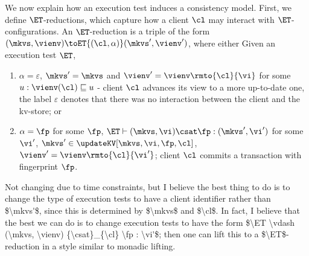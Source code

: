We now explain how an execution test induces a consistency model. First, 
we define $\ET$-reductions, which capture how a client $\cl$ may interact with $\ET$-configurations. 
An $\ET$-reduction is a triple of the form $(\mkvs, \vienv) \toET{(\cl, \alpha)} (\mkvs', \vienv')$, 
where either 
Given an execution test  $\ET$, %
\begin{enumerate}
    \item $\alpha = \varepsilon$, $\mkvs' = \mkvs$ and $\vienv' = \vienv\rmto{\cl}{\vi}$ for some $u: \vienv(\cl) \sqsubseteq u$ - 
	client $\cl$ advances its view to a more up-to-date one, the label $\varepsilon$ denotes that there was no interaction between the client and the kv-store; or 
\item $\alpha = \fp$ for some $\fp$, $\ET \vdash (\mkvs, \vi ) \csat \fp : (\mkvs', \vi')$ for some $\vi'$, $\mkvs' \in \updateKV[\mkvs, \vi, \fp, \cl]$, 
    $\vienv' = \vienv\rmto{\cl}{\vi'}$; client $\cl$ 
	commits a transaction with fingerprint $\fp$.
\end{enumerate}
\ac{Not changing due to time constraints, but I believe the best thing to do is to change the type of execution tests to have a client identifier 
rather than $\mkvs'$, since this is determined by $\mkvs$ and $\cl$. In fact, I believe that the best we can do is to change execution tests to 
have the form $\ET \vdash (\mkvs, \vienv) {\csat}_{\cl} \fp : \vi'$; then one can lift this to a $\ET$-reduction in a style similar to monadic lifting.}

